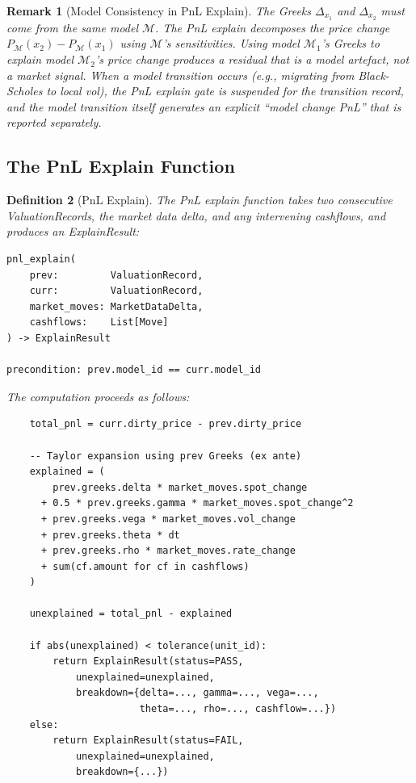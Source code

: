 \documentclass[11pt,a4paper]{article}
\newtheorem{definition}{Definition}[section]
\newtheorem{remark}[definition]{Remark}
\begin{document}
\begin{remark}[Model Consistency in PnL Explain]
\label{rem:model-consistency}
The Greeks $\Delta_{x_1}$ and $\Delta_{x_2}$ must come from the same model $\mathcal{M}$.  The PnL explain decomposes the price change $P_\mathcal{M}(x_2) - P_\mathcal{M}(x_1)$ using $\mathcal{M}$'s sensitivities.  Using model $\mathcal{M}_1$'s Greeks to explain model $\mathcal{M}_2$'s price change produces a residual that is a model artefact, not a market signal.  When a model transition occurs (e.g., migrating from Black-Scholes to local vol), the PnL explain gate is suspended for the transition record, and the model transition itself generates an explicit ``model change PnL'' that is reported separately.
\end{remark}

\subsection{The PnL Explain Function}

\begin{definition}[PnL Explain]
\label{def:pnl-explain}
The PnL explain function takes two consecutive ValuationRecords, the market data delta, and any intervening cashflows, and produces an ExplainResult:

\begin{lstlisting}
pnl_explain(
    prev:         ValuationRecord,
    curr:         ValuationRecord,
    market_moves: MarketDataDelta,
    cashflows:    List[Move]
) -> ExplainResult

precondition: prev.model_id == curr.model_id
\end{lstlisting}

\noindent The computation proceeds as follows:
\begin{lstlisting}
    total_pnl = curr.dirty_price - prev.dirty_price

    -- Taylor expansion using prev Greeks (ex ante)
    explained = (
        prev.greeks.delta * market_moves.spot_change
      + 0.5 * prev.greeks.gamma * market_moves.spot_change^2
      + prev.greeks.vega * market_moves.vol_change
      + prev.greeks.theta * dt
      + prev.greeks.rho * market_moves.rate_change
      + sum(cf.amount for cf in cashflows)
    )

    unexplained = total_pnl - explained

    if abs(unexplained) < tolerance(unit_id):
        return ExplainResult(status=PASS,
            unexplained=unexplained,
            breakdown={delta=..., gamma=..., vega=...,
                       theta=..., rho=..., cashflow=...})
    else:
        return ExplainResult(status=FAIL,
            unexplained=unexplained,
            breakdown={...})
\end{lstlisting}
\end{definition}
\end{document}
